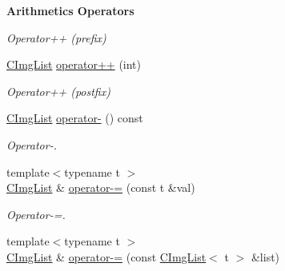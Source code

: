 \begin{Indent}{\bf Arithmetics Operators}
\begin{DoxyCompactItemize}
\begin{DoxyCompactList}\small\item\em Operator++ (prefix) \end{DoxyCompactList}\item 
\hypertarget{structcimg__library_1_1_c_img_list_a2a5506f136321f8e60c74aab49f73f46}{\hyperlink{structcimg__library_1_1_c_img_list}{C\-Img\-List} \hyperlink{structcimg__library_1_1_c_img_list_a2a5506f136321f8e60c74aab49f73f46}{operator++} (int)}\label{structcimg__library_1_1_c_img_list_a2a5506f136321f8e60c74aab49f73f46}

\begin{DoxyCompactList}\small\item\em Operator++ (postfix) \end{DoxyCompactList}\item 
\hypertarget{structcimg__library_1_1_c_img_list_a5b7efc7ecf0d44cad71662a9888b8222}{\hyperlink{structcimg__library_1_1_c_img_list}{C\-Img\-List} \hyperlink{structcimg__library_1_1_c_img_list_a5b7efc7ecf0d44cad71662a9888b8222}{operator-\/} () const }\label{structcimg__library_1_1_c_img_list_a5b7efc7ecf0d44cad71662a9888b8222}

\begin{DoxyCompactList}\small\item\em Operator-\/. \end{DoxyCompactList}\item 
\hypertarget{structcimg__library_1_1_c_img_list_a961b8c4790a32f8c6e4dc3957e18b364}{{\footnotesize template$<$typename t $>$ }\\\hyperlink{structcimg__library_1_1_c_img_list}{C\-Img\-List} \& \hyperlink{structcimg__library_1_1_c_img_list_a961b8c4790a32f8c6e4dc3957e18b364}{operator-\/=} (const t \&val)}\label{structcimg__library_1_1_c_img_list_a961b8c4790a32f8c6e4dc3957e18b364}

\begin{DoxyCompactList}\small\item\em Operator-\/=. \end{DoxyCompactList}\item 
\hypertarget{structcimg__library_1_1_c_img_list_af84da99fe436b471b62663373111fd45}{{\footnotesize template$<$typename t $>$ }\\\hyperlink{structcimg__library_1_1_c_img_list}{C\-Img\-List} \& \hyperlink{structcimg__library_1_1_c_img_list_af84da99fe436b471b62663373111fd45}{operator-\/=} (const \hyperlink{structcimg__library_1_1_c_img_list}{C\-Img\-List}$<$ t $>$ \&list)}\label{structcimg__library_1_1_c_img_list_af84da99fe436b471b62663373111fd45}


\end{DoxyCompactItemize}
\end{Indent}
